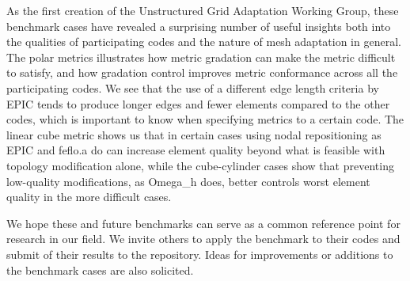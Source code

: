 \documentclass[3p,times,procedia,number]{elsarticle}
\begin{document}
As the first creation of the Unstructured Grid Adaptation Working Group, these benchmark cases have revealed
a surprising number of useful insights both into the qualities of participating codes and the
nature of mesh adaptation in general.
The polar metrics illustrates how metric gradation can make the metric difficult to satisfy,
and how gradation control improves metric conformance across all the participating codes.
We see that the use of a different edge length criteria by EPIC tends to produce longer edges
and fewer elements compared to the other codes,
which is important to know when specifying metrics to a certain code.
The linear cube metric shows us that in certain cases using nodal repositioning as EPIC and feflo.a do can increase element quality
beyond what is feasible with topology modification alone,
while the cube-cylinder cases show that preventing low-quality modifications, as Omega\_h does, better
controls worst element quality in the more difficult cases.

We hope these and future benchmarks can serve as a common reference point for research in our field.
We invite others to apply the benchmark to their codes and
submit of their results to the repository.
Ideas for improvements or additions to the benchmark cases are also solicited.



\end{document}
